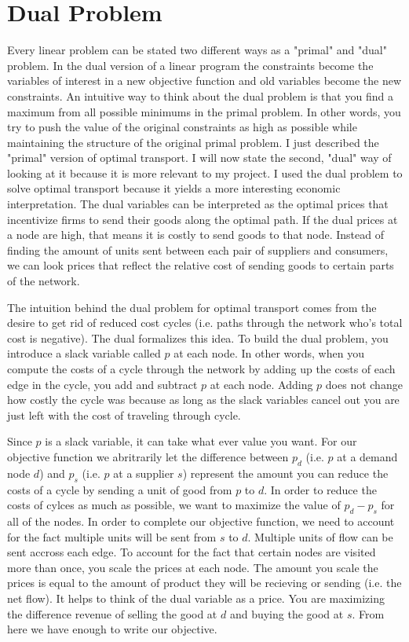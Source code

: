 \documentclass{report}
\begin{document}
\section{Dual Problem}

Every linear problem can be stated two different ways as a "primal" and "dual" problem. In the dual version of a linear program the constraints become the variables of interest in a new objective function and old variables become the new constraints. An intuitive way to think about the dual problem is that you find a maximum from all possible minimums in the primal problem. In other words, you try to push the value of the original constraints as high as possible while maintaining the structure of the original primal problem. I just described the "primal" version of optimal transport. I will now state the second, "dual" way of looking at it because it is more relevant to my project. I used the dual problem to solve optimal transport because it yields a more interesting economic interpretation. The dual variables can be interpreted as the optimal prices that incentivize firms to send their goods along the optimal path. If the dual prices at a node are high, that means it is costly to send goods to that node. Instead of finding the amount of units sent between each pair of suppliers and consumers, we can look prices that reflect the relative cost of sending goods to certain parts of the network.

The intuition behind the dual problem for optimal transport comes from the desire to get rid of reduced cost cycles (i.e. paths through the network who's total cost is negative). The dual formalizes this idea. To build the dual problem, you introduce a slack variable called $p$ at each node. In other words, when you compute the costs of a cycle through the network by adding up the costs of each edge in the cycle, you add and subtract $p$ at each node. Adding $p$ does not change how costly the cycle was because as long as the slack variables cancel out you are just left with the cost of traveling through cycle.

Since $p$ is a slack variable, it can take what ever value you want. For our objective function we abritrarily let the difference between $p_d$ (i.e. $p$ at a demand node $d$) and $p_s$  (i.e. $p$ at a supplier $s$) represent the amount you can reduce the costs of a cycle by sending a unit of good from $p$ to $d$. In order to reduce the costs of cylces as much as possible, we want to maximize the value of $p_d - p_s$ for all of the nodes.  In order to complete our objective function, we need to account for the fact multiple units will be sent from $s$ to $d$. Multiple units of flow can be sent accross each edge. To account for the fact that certain nodes are visited more than once, you scale the prices at each node. The amount you scale the prices is equal to the amount of product they will be recieving or sending (i.e. the net flow). It helps to think of the dual variable as a price. You are maximizing the difference revenue of selling the good at $d$ and buying the good at $s$. From here we have enough to write our objective.
\end{document}
